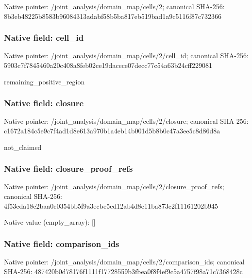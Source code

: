 \documentclass[10pt,a4paper]{article}
\begin{document}
Native pointer: /joint\_analysis/domain\_map/cells/2; canonical SHA-256: 8b3eb48225b8583b96084313\allowbreak{}adabf58b5ba817eb519bad1a\allowbreak{}9c5116f87c732366



\subsubsection{Native field: cell\_id}


Native pointer: /joint\_analysis/domain\_m\allowbreak{}ap/cells/2/cell\_id; canonical SHA-256: 5903c7f7845460a20c408a8f\allowbreak{}eb02ce19dacece07decc77c5\allowbreak{}4a63b24cff229081


remaining\_positive\_region


\subsubsection{Native field: closure}


Native pointer: /joint\_analysis/domain\_m\allowbreak{}ap/cells/2/closure; canonical SHA-256: c1672a184c5e9c7f4ad1d8e6\allowbreak{}13a970b1a4eb14b001d5b8b0\allowbreak{}c47a3ee5c8d86d8a


not\_claimed


\subsubsection{Native field: closure\_proof\_refs}


Native pointer: /joint\_analysis/domain\_m\allowbreak{}ap/cells/2/closure\_proof\allowbreak{}\_refs; canonical SHA-256: 4f53cda18c2baa0c0354bb5f\allowbreak{}9a3ecbe5ed12ab4d8e11ba87\allowbreak{}3c2f11161202b945



Native value (empty\_array): []



\subsubsection{Native field: comparison\_ids}


Native pointer: /joint\_analysis/domain\_m\allowbreak{}ap/cells/2/comparison\_id\allowbreak{}s; canonical SHA-256: 487420b0d78176f1111f1772\allowbreak{}8559b3fbea0f8f4ef9c5a475\allowbreak{}7f98a71c7368428c
\end{document}
